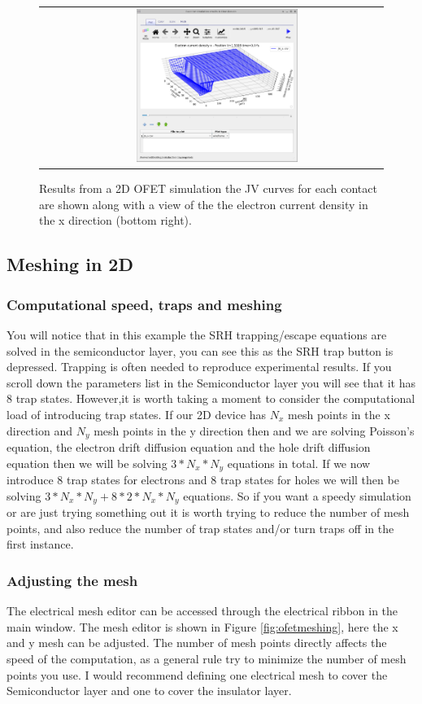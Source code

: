 \begin{figure}[H]
\begin{tabular}{ c c }
&
\includegraphics[width=0.5\textwidth,height=0.4\textwidth]{./images/ofet/ofet_10.png}
\\
\end{tabular}
\caption{Results from a 2D OFET simulation the JV curves for each contact are shown along with a view of the the electron current density in the x direction (bottom right).}
\label{tab:ofet_plots}
\end{figure}

\subsection{Meshing in 2D}
\subsubsection{Computational speed, traps and meshing}
You will notice that in this example the SRH trapping/escape equations are solved in the semiconductor layer, you can see this as the SRH trap button is depressed. Trapping is often needed to reproduce experimental results. If you scroll down the parameters list in the Semiconductor layer you will see that it has 8 trap states. However,it is worth taking a moment to consider the computational load of introducing trap states. If our 2D device has $N_x$ mesh points in the x direction and $N_y$ mesh points in the y direction then and we are solving Poisson's equation, the electron drift diffusion equation and the hole drift diffusion equation then we will be solving $3*N_{x}*N_{y}$ equations in total. If we now introduce 8 trap states for electrons and 8 trap states for holes we will then be solving $3*N_{x}*N_{y}+8*2*N_{x}*N_{y}$ equations. So if you want a speedy simulation or are just trying something out it is worth trying to reduce the number of mesh points, and also reduce the number of trap states and/or turn traps off in the first instance.

\subsubsection{Adjusting the mesh}
The electrical mesh editor can be accessed through the electrical ribbon in the main window. The mesh editor is shown in Figure \ref{fig:ofetmeshing}, here the x and y mesh can be adjusted. The number of mesh points directly affects the speed of the computation, as a general rule try to minimize the number of mesh points you use. I would recommend defining one electrical mesh to cover the Semiconductor layer and one to cover the insulator layer.

